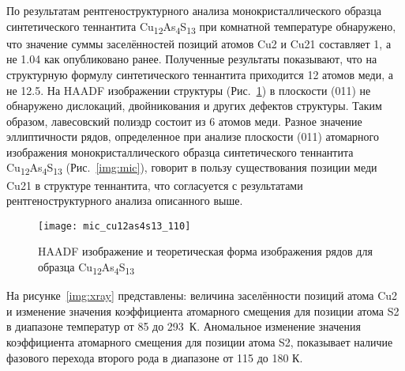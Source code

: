 По результатам рентгеноструктурного анализа монокристаллического образца синтетического теннантита Cu\textsubscript{12}As\textsubscript{4}S\textsubscript{13} при комнатной температуре обнаружено, что значение суммы заселённостей позиций атомов Cu2 и Cu21 составляет 1, а не 1.04 как опубликовано ранее\cite{Makovicky_2006}.
Полученные результаты показывают, что на структурную формулу синтетического теннантита приходится 12 атомов меди, а не 12.5. На HAADF изображении структуры (Рис.~\ref{img:mic3}) в плоскости (011) не обнаружено дислокаций, двойникования и других дефектов структуры.
Таким образом, лавесовский полиэдр состоит из 6 атомов меди.
Разное значение эллиптичности рядов, определенное при анализе плоскости (011) атомарного изображения монокристаллического образца синтетического теннантита Cu\textsubscript{12}As\textsubscript{4}S\textsubscript{13} (Рис.~\ref{img:mic}), говорит в пользу существования позиции меди Cu21 в структуре теннантита, что согласуется с результатами рентгеноструктурного анализа описанного выше.

\begin{figure}[h]
\centering
  \begin{minipage}[ht]{0.7\linewidth}\centering
    \texttt{[image: mic\_cu12as4s13\_110]} \\
  \end{minipage}

  \caption[HAADF изображение и теоретическая форма изображения рядов для образца Cu\textsubscript{12}As\textsubscript{4}S\textsubscript{13}]{HAADF изображение и теоретическая форма изображения рядов для образца Cu\textsubscript{12}As\textsubscript{4}S\textsubscript{13}}
    \label{img:mic3}
\end{figure}

На рисунке~\ref{img:xray} представлены: величина заселённости позиций атома Cu2 и изменение значения коэффициента атомарного смещения для позиции атома S2 в диапазоне температур от 85 до 293~К. Аномальное изменение значения коэффициента атомарного смещения для позиции атома S2, показывает наличие фазового перехода второго рода в диапазоне от 115 до 180 К.


